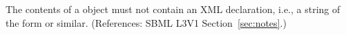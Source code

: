 The contents of a \Notes object must not contain an XML declaration, i.e.,
a string of the form  or
similar.  (References: SBML L3V1 Section~\ref{sec:notes}.)
